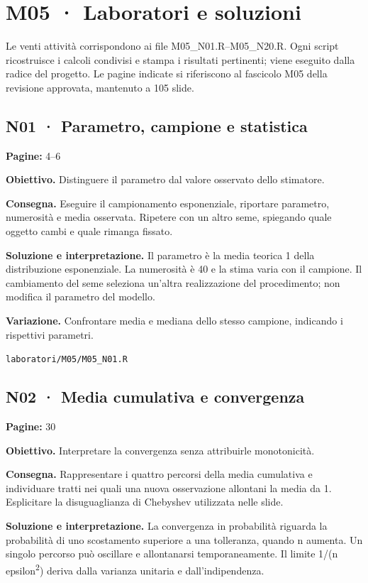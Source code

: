 \documentclass[11pt,a4paper]{article}
\begin{document}
\section*{M05 · Laboratori e soluzioni}

Le venti attività corrispondono ai file M05\_N01.R–M05\_N20.R. Ogni script ricostruisce i calcoli condivisi e stampa i risultati pertinenti; viene eseguito dalla radice del progetto. Le pagine indicate si riferiscono al fascicolo M05 della revisione approvata, mantenuto a 105 slide.

\newpage

\subsection*{N01 · Parametro, campione e statistica}

\textbf{Pagine:} 4–6

\textbf{Obiettivo.} Distinguere il parametro dal valore osservato dello stimatore.

\textbf{Consegna.} Eseguire il campionamento esponenziale, riportare parametro, numerosità e media osservata. Ripetere con un altro seme, spiegando quale oggetto cambi e quale rimanga fissato.

\textbf{Soluzione e interpretazione.} Il parametro è la media teorica 1 della distribuzione esponenziale. La numerosità è 40 e la stima varia con il campione. Il cambiamento del seme seleziona un’altra realizzazione del procedimento; non modifica il parametro del modello.

\textbf{Variazione.} Confrontare media e mediana dello stesso campione, indicando i rispettivi parametri.

\texttt{laboratori/M05/M05\_N01.R}

\subsection*{N02 · Media cumulativa e convergenza}

\textbf{Pagine:} 30

\textbf{Obiettivo.} Interpretare la convergenza senza attribuirle monotonicità.

\textbf{Consegna.} Rappresentare i quattro percorsi della media cumulativa e individuare tratti nei quali una nuova osservazione allontani la media da 1. Esplicitare la disuguaglianza di Chebyshev utilizzata nelle slide.

\textbf{Soluzione e interpretazione.} La convergenza in probabilità riguarda la probabilità di uno scostamento superiore a una tolleranza, quando n aumenta. Un singolo percorso può oscillare e allontanarsi temporaneamente. Il limite 1/(n epsilon\textsuperscript{2}) deriva dalla varianza unitaria e dall’indipendenza.
\end{document}
